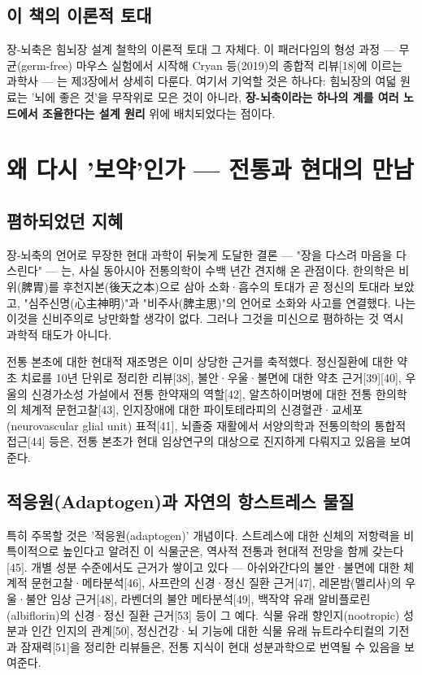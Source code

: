 \documentclass[11pt,oneside]{book}
\begin{document}
\subsection{이 책의 이론적 토대}
장-뇌축은 힘뇌장 설계 철학의 이론적 토대 그 자체다. 이 패러다임의 형성 과정 — 무균(germ-free) 마우스 실험에서 시작해 Cryan 등(2019)의 종합적 리뷰[18]에 이르는 과학사 — 는 제3장에서 상세히 다룬다. 여기서 기억할 것은 하나다: 힘뇌장의 여덟 원료는 '뇌에 좋은 것'을 무작위로 모은 것이 아니라, \textbf{장-뇌축이라는 하나의 계를 여러 노드에서 조율한다는 설계 원리} 위에 배치되었다는 점이다.

\section{왜 다시 '보약'인가 — 전통과 현대의 만남}
\subsection{폄하되었던 지혜}
장-뇌축의 언어로 무장한 현대 과학이 뒤늦게 도달한 결론 — "장을 다스려 마음을 다스린다" — 는, 사실 동아시아 전통의학이 수백 년간 견지해 온 관점이다. 한의학은 비위(脾胃)를 후천지본(後天之本)으로 삼아 소화·흡수의 토대가 곧 정신의 토대라 보았고, "심주신명(心主神明)"과 "비주사(脾主思)"의 언어로 소화와 사고를 연결했다. 나는 이것을 신비주의로 낭만화할 생각이 없다. 그러나 그것을 미신으로 폄하하는 것 역시 과학적 태도가 아니다.

전통 본초에 대한 현대적 재조명은 이미 상당한 근거를 축적했다. 정신질환에 대한 약초 치료를 10년 단위로 정리한 리뷰[38], 불안·우울·불면에 대한 약초 근거[39][40], 우울의 신경가소성 가설에서 전통 한약재의 역할[42], 알츠하이머병에 대한 전통 한의학의 체계적 문헌고찰[43], 인지장애에 대한 파이토테라피의 신경혈관·교세포(neurovascular glial unit) 표적[41], 뇌졸중 재활에서 서양의학과 전통의학의 통합적 접근[44] 등은, 전통 본초가 현대 임상연구의 대상으로 진지하게 다뤄지고 있음을 보여준다.

\subsection{적응원(Adaptogen)과 자연의 항스트레스 물질}
특히 주목할 것은 '적응원(adaptogen)' 개념이다. 스트레스에 대한 신체의 저항력을 비특이적으로 높인다고 알려진 이 식물군은, 역사적 전통과 현대적 전망을 함께 갖는다[45]. 개별 성분 수준에서도 근거가 쌓이고 있다 — 아쉬와간다의 불안·불면에 대한 체계적 문헌고찰·메타분석[46], 사프란의 신경·정신 질환 근거[47], 레몬밤(멜리사)의 우울·불안 임상 근거[48], 라벤더의 불안 메타분석[49], 백작약 유래 알비플로린(albiflorin)의 신경·정신 질환 근거[53] 등이 그 예다. 식물 유래 향인지(nootropic) 성분과 인간 인지의 관계[50], 정신건강·뇌 기능에 대한 식물 유래 뉴트라수티컬의 기전과 잠재력[51]을 정리한 리뷰들은, 전통 지식이 현대 성분과학으로 번역될 수 있음을 보여준다.
\end{document}

